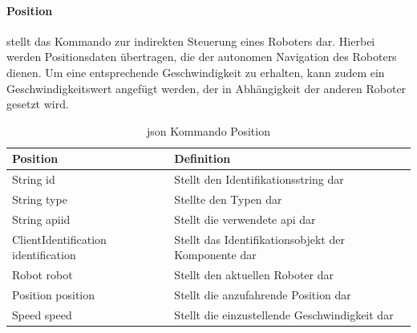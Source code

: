 \paragraph{Position} stellt das Kommando zur indirekten Steuerung eines Roboters dar. Hierbei werden Positionsdaten übertragen, die der autonomen Navigation des Roboters dienen. Um eine entsprechende Geschwindigkeit zu erhalten, kann zudem ein Geschwindigkeitswert angefügt werden, der in Abhängigkeit der anderen Roboter gesetzt wird.

\begin{table}[h]
	\centering
	\begin{tabular}{|p{4cm}|p{8cm}|}
		\hline
		\textbf{Position} & Definition\\
		\hline
		String id & Stellt den Identifikationsstring dar \\
		String type & Stellte den Typen dar \\
		String apiid & Stellt die verwendete \gls{api} dar \\
		ClientIdentification identification & Stellt das Identifikationsobjekt der Komponente dar \\
		Robot robot & Stellt den aktuellen Roboter dar\\
		Position position &  Stellt die anzufahrende Position dar\\
		Speed speed & Stellt die einzustellende Geschwindigkeit dar\\
		\hline
	\end{tabular}
	\caption[\gls{json} Kommando Position]{\gls{json} Kommando Position}
	\label{tab:Position}
\end{table}
